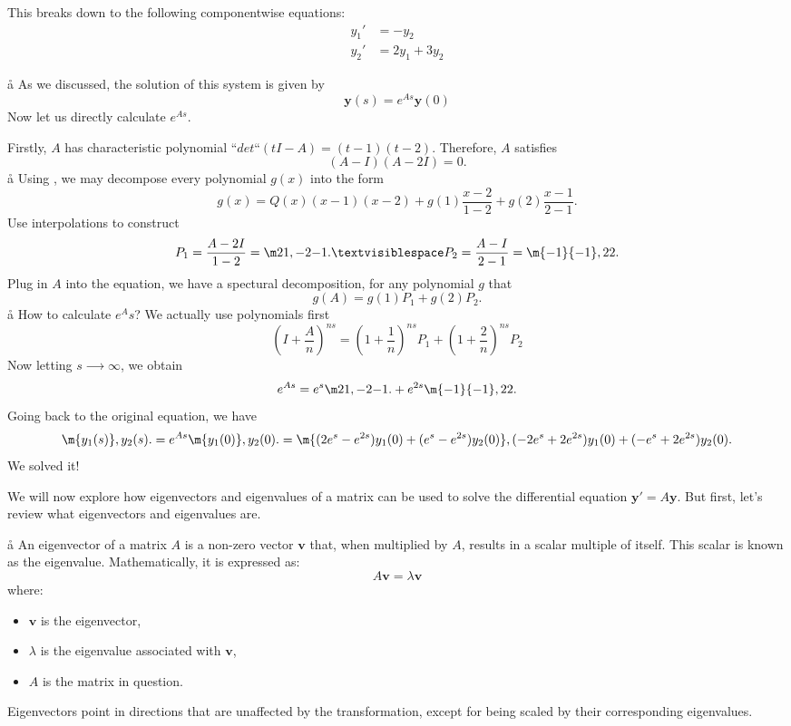 This breaks down to the following componentwise equations:
\begin{align*}
y_1' &= -y_2 \\
y_2' &= 2y_1 + 3y_2
\end{align*}

\a\aa
As we discussed, the solution of this system is given by
$$
\mathbf{y}(s)= e^{As}\mathbf{y}(0)
$$
Now let us directly calculate $e^{As}$.

Firstly, $A$ has characteristic polynomial $“det“(tI - A) = (t-1)(t-2)$. Therefore, $A$ satisfies
$$
(A-I)(A-2I) = 0.
$$
\a\aa
Using , we may decompose every polynomial $g(x)$ into the form
$$
g(x) = Q(x)(x-1)(x-2) + g(1)\frac{x-2}{1-2} + g(2) \frac{x-1}{2-1}.
$$
Use interpolations to construct 
$$
P_1 = \frac{A-2I}{1-2}=\m21,{-2}{-1}. ␣ 
P_2 = \frac{A-I}{2-1} = \m {-1}{-1},22.
$$
Plug in $A$ into the equation, we have a spectural decomposition, for any polynomial $g$ that
$$
g(A) = g(1)P_1 + g(2)P_2.
$$
\a\aa
How to calculate $e^As$? We actually use polynomials first
$$
\left(I+\frac An\right)^{ns} = 
\left(1+\frac 1n\right)^{ns}P_1
+ 
\left(1+\frac 2n\right)^{ns}P_2
$$
Now letting $s ⟶  ∞$, we obtain
$$
e^{As} = e^s \m21,{-2}{-1}. +e^{2s }\m {-1}{-1},22.
$$
Going back to the original equation, we have
$$
\m
{y_1(s)},
{y_2(s)}.
=
e^{As}
\m
{y_1(0)},
{y_2(0)}.
=
\m
{(2e^s-e^{2s})y_1(0) + (e^s-e^{2s})y_2(0)},
{(-2e^s+2e^{2s})y_1(0)+(-e^s+2e^{2s})y_2(0)}.
$$
We solved it!


We will now explore how eigenvectors and eigenvalues of a matrix can be used to solve the differential equation \( \mathbf{y}' = A\mathbf{y} \). But first, let's review what eigenvectors and eigenvalues are.

\a\aa
An eigenvector of a matrix \( A \) is a non-zero vector \( \mathbf{v} \) that, when multiplied by \( A \), results in a scalar multiple of itself. This scalar is known as the eigenvalue. Mathematically, it is expressed as:
$$
A\mathbf{v} = \lambda\mathbf{v}
$$
where:
\begin{itemize}
\item \( \mathbf{v} \) is the eigenvector,
\item \( \lambda \) is the eigenvalue associated with \( \mathbf{v} \),
\item \( A \) is the matrix in question.
\end{itemize}
Eigenvectors point in directions that are unaffected by the transformation, except for being scaled by their corresponding eigenvalues.

